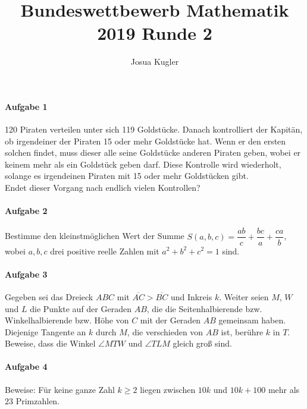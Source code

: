 \documentclass{article}
\title{Bundeswettbewerb Mathematik 2019 Runde 2}
\author{Josua Kugler}
\begin{document}
	\maketitle
	\paragraph*{Aufgabe 1} 120 Piraten verteilen unter sich 119 Goldstücke. Danach kontrolliert der Kapitän, ob irgendeiner der Piraten 15 oder mehr Goldstücke hat. Wenn er den ersten solchen findet, muss dieser alle seine Goldstücke anderen Piraten geben, wobei er keinem mehr als ein Goldstück geben darf. Diese Kontrolle wird wiederholt, solange es irgendeinen Piraten mit 15 oder mehr Goldstücken gibt.\\
	Endet dieser Vorgang nach endlich vielen Kontrollen?
	\paragraph*{Aufgabe 2} Bestimme den kleinstmöglichen Wert der Summe $S(a,b,c) = \dfrac{ab}{c} + \dfrac{bc}{a} + \dfrac{ca}{b}$, wobei $a, b, c$ drei positive reelle Zahlen mit $a^2 + b^2 + c^2 = 1$ sind.
	\paragraph*{Aufgabe 3} Gegeben sei das Dreieck $ABC$ mit $\overline{AC}>\overline{BC}$ und Inkreis $k$. Weiter seien $M$, $W$ und $L$ die Punkte auf der Geraden $AB$, die die Seitenhalbierende bzw. Winkelhalbierende bzw. Höhe von $C$ mit der Geraden $AB$ gemeinsam haben. Diejenige Tangente an $k$ durch $M$, die verschieden von $AB$ ist, berühre $k$ in $T$.\\
	Beweise, dass die Winkel $\angle MTW$ und $\angle TLM$ gleich groß sind.
	\paragraph*{Aufgabe 4} Beweise: Für keine ganze Zahl $k\geq 2$ liegen zwischen $10k$ und $10k+100$ mehr als $23$ Primzahlen.
	\newpage
\end{document}
